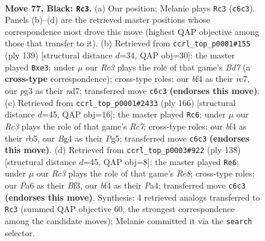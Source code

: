 \documentclass[11pt]{article}
\begin{document}
\clearpage

\begin{figure}[p]\centering
\begin{subfigure}{0.46\textwidth}\centering
\resizebox{\linewidth}{!}{%
\newchessgame
\chessboard[
  setfen={2n5/2P2k1K/p1r5/P4p1p/4pBb1/N5P1/8/R7 b - - 61 77},
  showmover=false,
  pgfstyle=straightmove, color=movearrow, markmove={c6-c3}
]}
\caption{}
\end{subfigure}\hfill
\begin{subfigure}{0.46\textwidth}\centering
\resizebox{\linewidth}{!}{%
\newchessgame
\chessboard[
  setfen={6k1/2RN1p2/6p1/p2p2Pr/4pP2/4P1B1/3b2K1/8 b - - 7 70},
  showmover=false,
  pgfstyle=straightmove, color=movearrow, markmove={d2-e3}
]}
\caption{}
\end{subfigure}
\\[4pt]
\begin{subfigure}{0.46\textwidth}\centering
\resizebox{\linewidth}{!}{%
\newchessgame
\chessboard[
  setfen={6k1/2R3b1/3B2p1/1r3pPp/5P1P/8/5PK1/8 w - - 31 84},
  showmover=false,
  pgfstyle=straightmove, color=movearrow, markmove={c7-c6}
]}
\caption{}
\end{subfigure}\hfill
\begin{subfigure}{0.46\textwidth}\centering
\resizebox{\linewidth}{!}{%
\newchessgame
\chessboard[
  setfen={4R3/3r2kp/1p6/p1b1p1pP/P1P1P3/1P3BK1/8/8 w - - 2 70},
  showmover=false,
  pgfstyle=straightmove, color=movearrow, markmove={e8-e6}
]}
\caption{}
\end{subfigure}
\caption{\textbf{Move 77, Black: \texttt{Rc3}.} (a) Our position; Melanie plays \texttt{Rc3} (\texttt{c6c3}). Panels (b)--(d) are the retrieved master positions whose correspondence most drove this move (highest QAP objective among those that transfer to it). (b) Retrieved from \texttt{ccrl\_top\_p0001\#155} (ply 139) [structural distance $d$=34, QAP obj=30]: the master played \texttt{Bxe3}; under $\mu$ our \emph{Rc3} plays the role of that game's \emph{Bd7} (a \textbf{cross-type} correspondence); cross-type roles: our \emph{b}f4 as their \emph{r}c7, our \emph{p}g3 as their \emph{n}d7; transferred move \texttt{c6c3} \textbf{(endorses this move)}. (c) Retrieved from \texttt{ccrl\_top\_p0001\#2433} (ply 166) [structural distance $d$=45, QAP obj=16]: the master played \texttt{Rc6}; under $\mu$ our \emph{Rc3} plays the role of that game's \emph{Rc7}; cross-type roles: our \emph{b}f4 as their \emph{r}b5, our \emph{B}g4 as their \emph{P}g5; transferred move \texttt{c6c3} \textbf{(endorses this move)}. (d) Retrieved from \texttt{ccrl\_top\_p0003\#922} (ply 138) [structural distance $d$=45, QAP obj=8]: the master played \texttt{Re6}; under $\mu$ our \emph{Rc3} plays the role of that game's \emph{Re8}; cross-type roles: our \emph{P}a6 as their \emph{B}f3, our \emph{b}f4 as their \emph{P}a4; transferred move \texttt{c6c3} \textbf{(endorses this move)}. Synthesis: 4 retrieved analogs transferred to \texttt{Rc3} (summed QAP objective 60, the strongest correspondence among the candidate moves); Melanie committed it via the \texttt{search} selector.}
\label{fig:thought-m153}
\end{figure}
\end{document}
